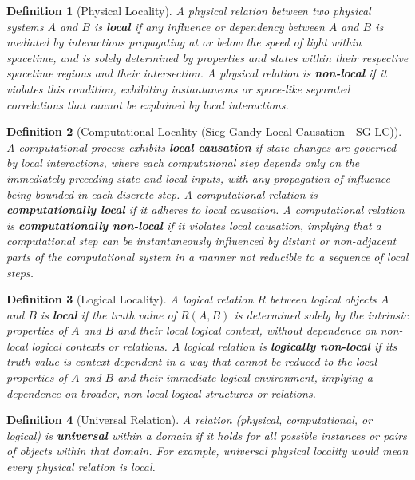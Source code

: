 \documentclass{article}
\newtheorem{definition}{Definition}
\begin{document}
	\begin{definition}[Physical Locality]
		A physical relation between two physical systems $A$ and $B$ is \textbf{local} if any influence or dependency between $A$ and $B$ is mediated by interactions propagating at or below the speed of light within spacetime, and is solely determined by properties and states within their respective spacetime regions and their intersection. A physical relation is \textbf{non-local} if it violates this condition, exhibiting instantaneous or space-like separated correlations that cannot be explained by local interactions.
	\end{definition}
	
	\begin{definition}[Computational Locality (Sieg-Gandy Local Causation - SG-LC)]
		A computational process exhibits \textbf{local causation} if state changes are governed by local interactions, where each computational step depends only on the immediately preceding state and local inputs, with any propagation of influence being bounded in each discrete step. A computational relation is \textbf{computationally local} if it adheres to local causation. A computational relation is \textbf{computationally non-local} if it violates local causation, implying that a computational step can be instantaneously influenced by distant or non-adjacent parts of the computational system in a manner not reducible to a sequence of local steps.
	\end{definition}
	
	\begin{definition}[Logical Locality]
		A logical relation $R$ between logical objects $A$ and $B$ is \textbf{local} if the truth value of $R(A, B)$ is determined solely by the intrinsic properties of $A$ and $B$ and their local logical context, without dependence on non-local logical contexts or relations. A logical relation is \textbf{logically non-local} if its truth value is context-dependent in a way that cannot be reduced to the local properties of $A$ and $B$ and their immediate logical environment, implying a dependence on broader, non-local logical structures or relations.
	\end{definition}
	
	\begin{definition}[Universal Relation]
		A relation (physical, computational, or logical) is \textbf{universal} within a domain if it holds for all possible instances or pairs of objects within that domain. For example, universal physical locality would mean every physical relation is local.
	\end{definition}
	
\end{document}
